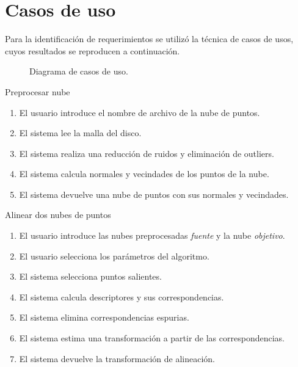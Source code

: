 \section{Casos de uso}
Para la identificación de requerimientos se utilizó la técnica de casos de usos,
cuyos resultados se reproducen a continuación.

\begin{figure}[h]
	\caption[Diagrama de casos de uso]{\label{fig:casos_de_uso}Diagrama de casos de uso.}
\end{figure}

\begin{CasoDeUso}{Preprocesar nube}
	\CUNormal
	\begin{enumerate}
		\item El usuario introduce el nombre de archivo de la nube de puntos.
		\item El sistema lee la malla del disco.
		\item El sistema realiza una reducción de ruidos y eliminación de outliers.
		\item El sistema calcula normales y vecindades de los puntos de la nube.
		\item El sistema devuelve una nube de puntos con sus normales y vecindades.
	\end{enumerate}
\end{CasoDeUso}

\begin{CasoDeUso}{Alinear dos nubes de puntos}
	\CUNormal
	\begin{enumerate}
		\item El usuario introduce las nubes preprocesadas \emph{fuente} y la nube \emph{objetivo}. 
		\item El usuario selecciona los parámetros del algoritmo.
		\item El sistema selecciona puntos salientes.
		\item El sistema calcula descriptores y sus correspondencias.
		\item El sistema elimina correspondencias espurias.
		\item El sistema estima una transformación a partir de las correspondencias.
		\item El sistema devuelve la transformación de alineación.
	\end{enumerate}
\end{CasoDeUso}

